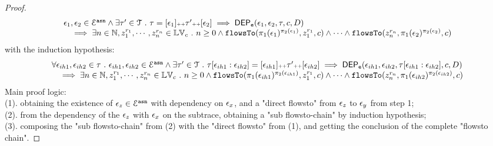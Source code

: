 \begin{proof}
\[\begin{array}{l}
    \mathtt{\epsilon}_1, \mathtt{\epsilon}_2 \in \mathcal{E}^{\mathtt{{asn}}} \land 
		 \exists \mathtt{\tau}' \in \mathcal{T} ~.~ \mathtt{\tau} = [\mathtt{\epsilon}_1] {\scriptscriptstyle ++} \mathtt{\tau}' {\scriptscriptstyle ++} [\mathtt{\epsilon}_2]
		\implies
		\mathsf{DEP_{\mathtt{e}}}(\mathtt{\epsilon}_1, \mathtt{\epsilon}_2, \mathtt{\tau}, c, D) 
		\\ \quad 
		\implies 
    \exists n \in \mathbb{N}, z_1^{r_1}, \cdots, z_n^{r_n} \in \mathbb{LV}_{{c}} ~.~ n \geq 0 \land
		\mathtt{flowsTo}(\pi_1(\mathtt{\epsilon}_1)^{\pi_2(\mathtt{\epsilon}_1)},  z_1^{r_1}, c) 
    \land \cdots \land \mathtt{flowsTo}(z_n^{r_n}, \pi_1(\mathtt{\epsilon}_2)^{\pi_2(\mathtt{\epsilon}_2)}, c) 
	\end{array}
\]
with the induction hypothesis:
\[
  \begin{array}{l}
    \forall \mathtt{\epsilon}_{ih1}, \mathtt{\epsilon}_{ih2} \in \mathtt{\tau} ~.~ \mathtt{\epsilon}_{ih1}, \mathtt{\epsilon}_{ih2} \in \mathcal{E}^{\mathtt{{asn}}} 
    \land
		 \exists \mathtt{\tau}' \in \mathcal{T} ~.~ 
     \mathtt{\tau}[\mathtt{\epsilon}_{ih1}:\mathtt{\epsilon}_{ih2}] = [\mathtt{\epsilon}_{ih1}] {\scriptscriptstyle ++} \mathtt{\tau}' {\scriptscriptstyle ++} [\mathtt{\epsilon}_{ih2}]
		\implies
		\mathsf{DEP_{\mathtt{e}}}(\mathtt{\epsilon}_{ih1}, \mathtt{\epsilon}_{ih2}, \mathtt{\tau}[\mathtt{\epsilon}_{ih1}:\mathtt{\epsilon}_{ih2}], c, D) 
		\\ \quad 
		\implies 
    \exists n \in \mathbb{N}, z_1^{r_1}, \cdots, z_n^{r_n} \in \mathbb{LV}_{{c}} ~.~ n \geq 0 \land
		\mathtt{flowsTo}(\pi_1(\mathtt{\epsilon}_{ih1})^{\pi_2(\mathtt{\epsilon}_{ih1})},  z_1^{r_1}, c) 
    \land \cdots \land \mathtt{flowsTo}(z_n^{r_n}, \pi_1(\mathtt{\epsilon}_{ih2})^{\pi_2(\mathtt{\epsilon}_{ih2})}, c) 
  \end{array}
  \]
%
Main proof logic:
\\
(1). obtaining the existence of $\mathtt{\epsilon}_z \in \mathcal{E}^{\mathtt{{asn}}} $ with dependency on $\mathtt{\epsilon}_x$, and a "direct flowsto" from $\mathtt{\epsilon}_z$ to $\mathtt{\epsilon}_y$
 from step 1;
 \\
(2). from the dependency of the $\mathtt{\epsilon}_z$ with $\mathtt{\epsilon}_x$ on the subtrace,
 obtaining a "sub flowsto-chain" by induction  hypothesis;
 \\
(3). composing the "sub flowsto-chain" from (2) with the  "direct flowsto" from (1), and getting the conclusion of
 the complete "flowsto chain".
%


\end{proof}
